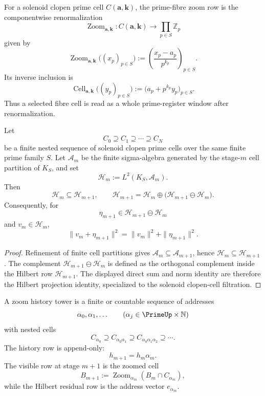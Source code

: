 \begin{definition}
\label{def:rh-prime-fibre-zoom-row}
For a solenoid clopen prime cell
$C(\mathbf a,\mathbf k)$, the prime-fibre zoom row is the componentwise
renormalization
$$
\operatorname{Zoom}_{\mathbf a,\mathbf k}
:
C(\mathbf a,\mathbf k)\to
\prod_{p\in S}\mathbb Z_p
$$
given by
$$
\operatorname{Zoom}_{\mathbf a,\mathbf k}
\bigl((x_p)_{p\in S}\bigr)
:=
\left(
\frac{x_p-a_p}{p^{k_p}}
\right)_{p\in S}.
$$
Its inverse inclusion is
$$
\operatorname{Cell}_{\mathbf a,\mathbf k}
\bigl((y_p)_{p\in S}\bigr)
:=
\bigl(a_p+p^{k_p}y_p\bigr)_{p\in S}.
$$
Thus a selected fibre cell is read as a whole prime-register window
after renormalization.
\end{definition}

\begin{theorem}
\label{thm:rh-solenoid-clopen-refinement-orthogonal-filtration}
Let
$$
C_0\supseteq C_1\supseteq\cdots\supseteq C_N
$$
be a finite nested sequence of solenoid clopen prime cells over the same
finite prime family $S$. Let $\mathcal A_m$ be the finite sigma-algebra
generated by the stage-$m$ cell partition of $K_S$, and set
$$
\mathcal H_m:=L^2(K_S,\mathcal A_m).
$$
Then
$$
\mathcal H_m\subseteq\mathcal H_{m+1},
\qquad
\mathcal H_{m+1}
=
\mathcal H_m\oplus
\bigl(\mathcal H_{m+1}\ominus\mathcal H_m\bigr).
$$
Consequently, for
$$
\eta_{m+1}\in
\mathcal H_{m+1}\ominus\mathcal H_m
$$
and $v_m\in\mathcal H_m$,
$$
\|v_m+\eta_{m+1}\|^2
=
\|v_m\|^2+\|\eta_{m+1}\|^2.
$$
\end{theorem}

\begin{proof}
Refinement of finite cell partitions gives
$\mathcal A_m\subseteq\mathcal A_{m+1}$, hence
$\mathcal H_m\subseteq\mathcal H_{m+1}$. The complement
$\mathcal H_{m+1}\ominus\mathcal H_m$ is defined as the orthogonal
complement inside the Hilbert row $\mathcal H_{m+1}$. The displayed
direct sum and norm identity are therefore the Hilbert projection
identity, specialized to the solenoid clopen-cell filtration.
\end{proof}

\begin{definition}
\label{def:rh-prime-fiber-zoom-history-tower}
A zoom history tower is a finite or countable sequence of addresses
$$
\alpha_0,\alpha_1,\ldots
\qquad
(\alpha_j\in\PrimeUp\times\mathbb N)
$$
with nested cells
$$
C_{\alpha_0}
\supseteq
C_{\alpha_0\alpha_1}
\supseteq
C_{\alpha_0\alpha_1\alpha_2}
\supseteq\cdots.
$$
The history row is append-only:
$$
h_{m+1}=h_m\alpha_m.
$$
The visible row at stage $m+1$ is the zoomed cell
$$
B_{m+1}
:=
\operatorname{Zoom}_{\alpha_m}(B_m\cap C_{\alpha_m}),
$$
while the Hilbert residual row is the address vector $e_{\alpha_m}$.
\end{definition}

